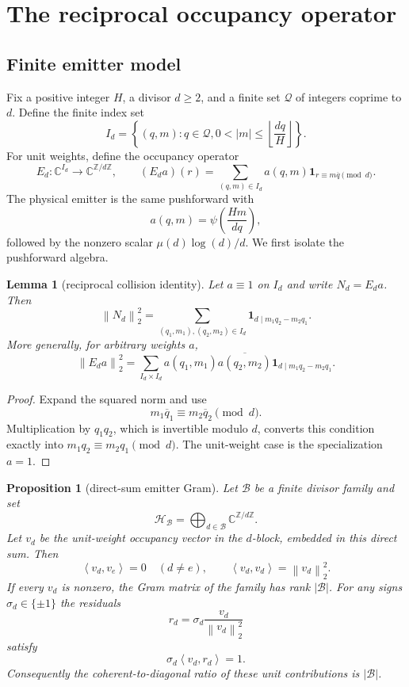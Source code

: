\documentclass[11pt]{article}
\newtheorem{proposition}[theorem]{Proposition}
\newtheorem{lemma}[theorem]{Lemma}
\theoremstyle{definition}
\theoremstyle{remark}
\newcommand{\ZZ}{\mathbb Z}
\newcommand{\CC}{\mathbb C}
\newcommand{\muM}{\mu}
\newcommand{\ip}[2]{\left\langle #1,#2\right\rangle}
\newcommand{\norm}[1]{\left\lVert #1\right\rVert}
\begin{document}
\section{The reciprocal occupancy operator}

\subsection{Finite emitter model}

Fix a positive integer $H$, a divisor $d\geq2$, and a finite set $\mathcal Q$
of integers coprime to $d$.  Define the finite index set
\[
 I_d=\left\{(q,m):q\in\mathcal Q,
 0<|m|\leq\left\lfloor\frac{dq}{H}\right\rfloor\right\}.
\]
For unit weights, define the occupancy operator
\[
 E_d:\CC^{I_d}\longrightarrow\CC^{\ZZ/d\ZZ},
 \qquad
 (E_d a)(r)=\sum_{(q,m)\in I_d}
 a(q,m)\mathbf 1_{r\equiv m\overline q\pmod d}.
 \label{eq:occupancy-operator}
\]
The physical emitter is the same pushforward with
\[
 a(q,m)=\psi\!\left(\frac{Hm}{dq}\right),
\]
followed by the nonzero scalar $\muM(d)\log(d)/d$.  We first isolate the
pushforward algebra.

\begin{lemma}[reciprocal collision identity]
\label{lem:collision}
Let $a\equiv1$ on $I_d$ and write $N_d=E_d a$.  Then
\begin{equation}
 \norm{N_d}_2^2
 =\sum_{(q_1,m_1),(q_2,m_2)\in I_d}
 \mathbf 1_{d\mid m_1q_2-m_2q_1}.
 \label{eq:collision}
\end{equation}
More generally, for arbitrary weights $a$,
\begin{equation}
 \norm{E_da}_2^2
 =\sum_{I_d\times I_d}a(q_1,m_1)\overline{a(q_2,m_2)}
 \mathbf 1_{d\mid m_1q_2-m_2q_1}.
 \label{eq:weighted-collision}
\end{equation}
\end{lemma}

\begin{proof}
Expand the squared norm and use
\[
 m_1\overline q_1\equiv m_2\overline q_2\pmod d.
\]
Multiplication by $q_1q_2$, which is invertible modulo $d$, converts this
condition exactly into $m_1q_2\equiv m_2q_1\pmod d$.  The unit-weight case
is the specialization $a=1$.
\end{proof}

\begin{proposition}[direct-sum emitter Gram]
\label{prop:direct-sum}
Let $\mathcal B$ be a finite divisor family and set
\[
 \mathcal H_\mathcal B=\bigoplus_{d\in\mathcal B}\CC^{\ZZ/d\ZZ}.
\]
Let $v_d$ be the unit-weight occupancy vector in the $d$-block, embedded in
this direct sum.  Then
\[
 \ip{v_d}{v_e}=0\quad(d\ne e),
 \qquad
 \ip{v_d}{v_d}=\norm{v_d}_2^2.
 \label{eq:block-gram}
\]
If every $v_d$ is nonzero, the Gram matrix of the family has rank
$|\mathcal B|$.  For any signs $\sigma_d\in\{\pm1\}$ the residuals
\[
 r_d=\sigma_d\frac{v_d}{\norm{v_d}_2^2}
 \label{eq:aligned-residual}
\]
satisfy
\[
 \sigma_d\ip{v_d}{r_d}=1.
 \label{eq:aligned-contribution}
\]
Consequently the coherent-to-diagonal ratio of these unit contributions is
$|\mathcal B|$.
\end{proposition}
\end{document}
